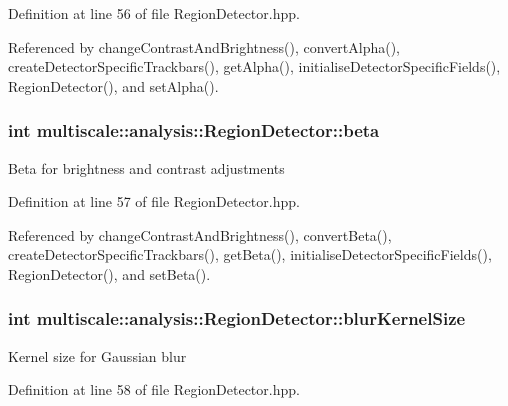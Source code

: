 Definition at line 56 of file Region\-Detector.\-hpp.



Referenced by change\-Contrast\-And\-Brightness(), convert\-Alpha(), create\-Detector\-Specific\-Trackbars(), get\-Alpha(), initialise\-Detector\-Specific\-Fields(), Region\-Detector(), and set\-Alpha().

\hypertarget{classmultiscale_1_1analysis_1_1RegionDetector_a23c831170c2264dd7e59067a1a7d3c8e}{
\subsubsection[{beta}]{\setlength{\rightskip}{0pt plus 5cm}int multiscale\-::analysis\-::\-Region\-Detector\-::beta\hspace{0.3cm}{\ttfamily [private]}}}\label{classmultiscale_1_1analysis_1_1RegionDetector_a23c831170c2264dd7e59067a1a7d3c8e}
Beta for brightness and contrast adjustments 

Definition at line 57 of file Region\-Detector.\-hpp.



Referenced by change\-Contrast\-And\-Brightness(), convert\-Beta(), create\-Detector\-Specific\-Trackbars(), get\-Beta(), initialise\-Detector\-Specific\-Fields(), Region\-Detector(), and set\-Beta().

\hypertarget{classmultiscale_1_1analysis_1_1RegionDetector_aae6ee0ec7f0a610dd8a906c1eb181bc7}{
\subsubsection[{blur\-Kernel\-Size}]{\setlength{\rightskip}{0pt plus 5cm}int multiscale\-::analysis\-::\-Region\-Detector\-::blur\-Kernel\-Size\hspace{0.3cm}{\ttfamily [private]}}}\label{classmultiscale_1_1analysis_1_1RegionDetector_aae6ee0ec7f0a610dd8a906c1eb181bc7}
Kernel size for Gaussian blur 

Definition at line 58 of file Region\-Detector.\-hpp.



